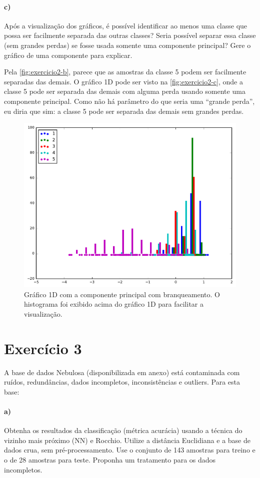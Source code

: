 \documentclass{article}
\begin{document}
\paragraph{c)} Após a visualização dos gráficos, é possível identificar ao menos uma classe que possa ser facilmente separada das outras classes? Seria possível separar essa classe (sem grandes perdas) se fosse usada somente uma componente principal? Gere o gráfico de uma componente para explicar.

Pela \autoref{fig:exercicio2-b}, parece que as amostras da classe 5 podem ser facilmente separadas das demais. O gráfico 1D pode ser visto na \autoref{fig:exercicio2-c}, onde a classe 5 pode ser separada das demais com alguma perda usando somente uma componente principal. Como não há parâmetro do que seria uma ``grande perda'', eu diria que sim: a classe 5 pode ser separada das demais sem grandes perdas.

\begin{figure}[h]
	\centering
	\includegraphics[width=0.5\linewidth]{exercicio2-c.pdf}
	\caption{Gráfico 1D com a componente principal com branqueamento. O histograma foi exibido acima do gráfico 1D para facilitar a visualização.}
	\label{fig:exercicio2-c}
\end{figure}

\section{Exercício 3}

A base de dados Nebulosa (disponibilizada em anexo) está contaminada com ruídos, redundâncias, dados incompletos, inconsistências e outliers. Para esta base:

\paragraph{a)} Obtenha os resultados da classificação (métrica acurácia) usando a técnica do vizinho mais próximo (NN) e Rocchio. Utilize a distância Euclidiana e a base de dados crua, sem pré-processamento. Use o conjunto de 143 amostras para treino e o de 28 amostras para teste. Proponha um tratamento para os dados incompletos.
\end{document}

